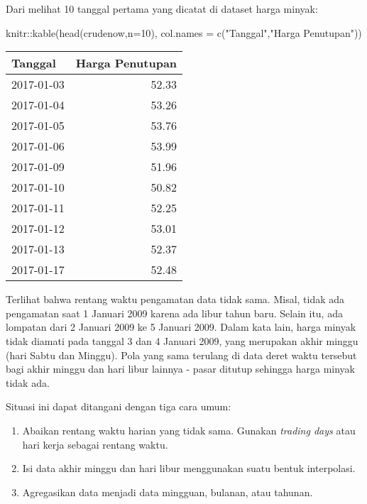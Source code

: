 \documentclass[
]{book}
\newenvironment{Shaded}{\begin{snugshade}}{\end{snugshade}}
\newcommand{\AttributeTok}[1]{\textcolor[rgb]{0.77,0.63,0.00}{#1}}
\newcommand{\DecValTok}[1]{\textcolor[rgb]{0.00,0.00,0.81}{#1}}
\newcommand{\FunctionTok}[1]{\textcolor[rgb]{0.00,0.00,0.00}{#1}}
\newcommand{\NormalTok}[1]{#1}
\newcommand{\SpecialCharTok}[1]{\textcolor[rgb]{0.00,0.00,0.00}{#1}}
\newcommand{\StringTok}[1]{\textcolor[rgb]{0.31,0.60,0.02}{#1}}
\providecommand{\tightlist}{%
  \setlength{\itemsep}{0pt}\setlength{\parskip}{0pt}}
\begin{document}
Dari melihat 10 tanggal pertama yang dicatat di dataset harga minyak:

\begin{Shaded}
\begin{Highlighting}[]
\NormalTok{knitr}\SpecialCharTok{::}\FunctionTok{kable}\NormalTok{(}\FunctionTok{head}\NormalTok{(crudenow,}\AttributeTok{n=}\DecValTok{10}\NormalTok{),}
             \AttributeTok{col.names =} \FunctionTok{c}\NormalTok{(}\StringTok{"Tanggal"}\NormalTok{,}\StringTok{"Harga Penutupan"}\NormalTok{))}
\end{Highlighting}
\end{Shaded}

\begin{tabular}{l|r}
\hline
Tanggal & Harga Penutupan\\
\hline
2017-01-03 & 52.33\\
\hline
2017-01-04 & 53.26\\
\hline
2017-01-05 & 53.76\\
\hline
2017-01-06 & 53.99\\
\hline
2017-01-09 & 51.96\\
\hline
2017-01-10 & 50.82\\
\hline
2017-01-11 & 52.25\\
\hline
2017-01-12 & 53.01\\
\hline
2017-01-13 & 52.37\\
\hline
2017-01-17 & 52.48\\
\hline
\end{tabular}

Terlihat bahwa rentang waktu pengamatan data tidak sama. Misal, tidak ada pengamatan saat 1 Januari 2009 karena ada libur tahun baru. Selain itu, ada lompatan dari 2 Januari 2009 ke 5 Januari 2009. Dalam kata lain, harga minyak tidak diamati pada tanggal 3 dan 4 Januari 2009, yang merupakan akhir minggu (hari Sabtu dan Minggu). Pola yang sama terulang di data deret waktu tersebut bagi akhir minggu dan hari libur lainnya - pasar ditutup sehingga harga minyak tidak ada.

Situasi ini dapat ditangani dengan tiga cara umum:

\begin{enumerate}
\def\labelenumi{\arabic{enumi}.}
\tightlist
\item
  Abaikan rentang waktu harian yang tidak sama. Gunakan \emph{trading days} atau hari kerja sebagai rentang waktu.
\item
  Isi data akhir minggu dan hari libur menggunakan suatu bentuk interpolasi.
\item
  Agregasikan data menjadi data mingguan, bulanan, atau tahunan.
\end{enumerate}
\end{document}
